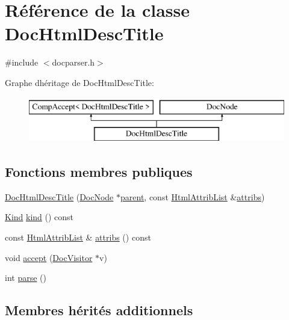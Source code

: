 \hypertarget{class_doc_html_desc_title}{}\section{Référence de la classe Doc\+Html\+Desc\+Title}
\label{class_doc_html_desc_title}


{\ttfamily \#include $<$docparser.\+h$>$}

Graphe d\textquotesingle{}héritage de Doc\+Html\+Desc\+Title\+:\begin{figure}[H]
\begin{center}
\leavevmode
\includegraphics[height=2.000000cm]{class_doc_html_desc_title}
\end{center}
\end{figure}
\subsection*{Fonctions membres publiques}
\begin{DoxyCompactItemize}
\item 
\hyperlink{class_doc_html_desc_title_a1fb2e4eafa41ffce00f9be9c8979a5a3}{Doc\+Html\+Desc\+Title} (\hyperlink{class_doc_node}{Doc\+Node} $\ast$\hyperlink{class_doc_node_a990d8b983962776a647e6231d38bd329}{parent}, const \hyperlink{class_html_attrib_list}{Html\+Attrib\+List} \&\hyperlink{class_doc_html_desc_title_ae146a289dbb4df5a6cea5a97c833a8de}{attribs})
\item 
\hyperlink{class_doc_node_aebd16e89ca590d84cbd40543ea5faadb}{Kind} \hyperlink{class_doc_html_desc_title_a8630a49156f0a7fb48f873fe01075dc1}{kind} () const 
\item 
const \hyperlink{class_html_attrib_list}{Html\+Attrib\+List} \& \hyperlink{class_doc_html_desc_title_ae146a289dbb4df5a6cea5a97c833a8de}{attribs} () const 
\item 
void \hyperlink{class_doc_html_desc_title_a66fa1bbbff8bf83e80844aa642ddca89}{accept} (\hyperlink{class_doc_visitor}{Doc\+Visitor} $\ast$v)
\item 
int \hyperlink{class_doc_html_desc_title_a2ca3a4d56f61574d9454cb2492fd3e58}{parse} ()
\end{DoxyCompactItemize}
\subsection*{Membres hérités additionnels}


